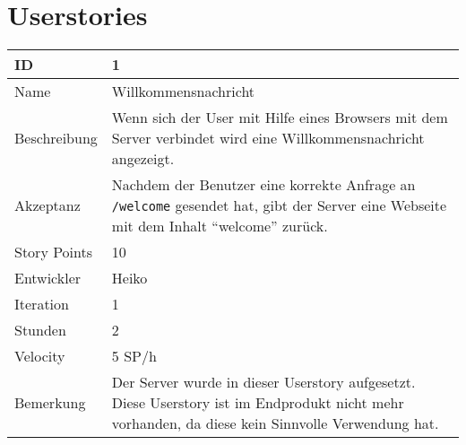 \section{Userstories}

\begin{table}[htbp]
    \begin{minipage}{\linewidth}
        \setlength{\tymax}{0.5\linewidth}
        \centering
        \small
        \begin{tabulary}{\textwidth}{|l|p{10cm}|} \hline
            ID   & 1 \\\hline
            Name  & Willkommensnachricht\\\hline
            Beschreibung& Wenn sich der User mit Hilfe eines Browsers mit dem Server verbindet wird eine Willkommensnachricht angezeigt. \\\hline
            Akzeptanz &Nachdem der Benutzer eine korrekte Anfrage an \texttt{\slash welcome} gesendet hat, gibt der Server eine Webseite mit dem Inhalt ``welcome'' zurück.\\\hline
            Story Points&10\\\hline
            Entwickler &Heiko\\\hline
            Iteration &1\\\hline
            Stunden  &2\\\hline
            Velocity &5 SP\slash h\\\hline
            Bemerkung &Der Server wurde in dieser Userstory aufgesetzt. Diese Userstory ist im Endprodukt nicht mehr vorhanden, da diese kein Sinnvolle Verwendung hat.\\\hline
        \end{tabulary}
    \end{minipage}
\end{table}



